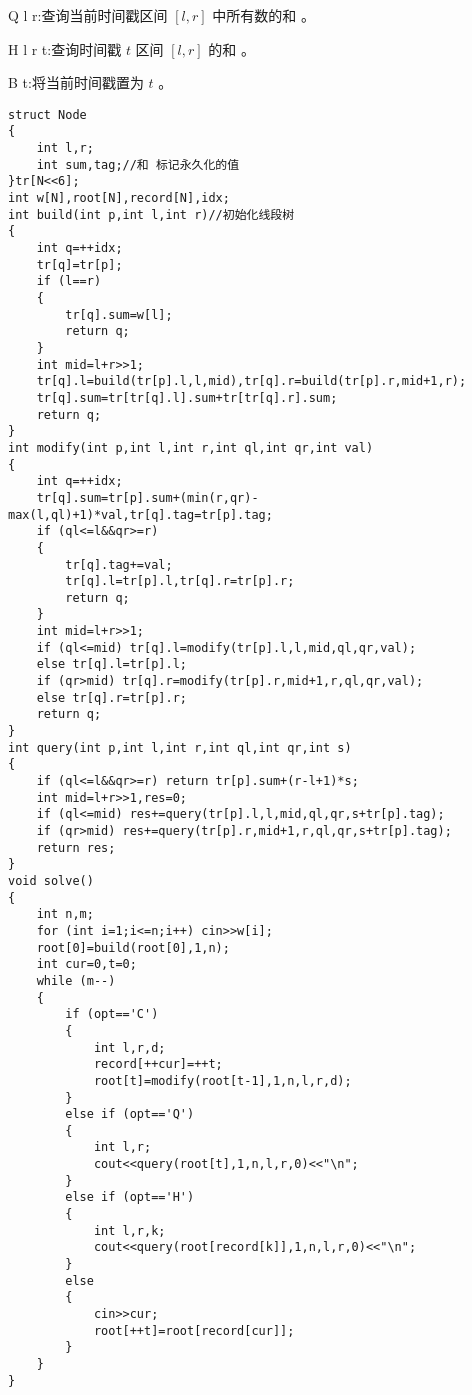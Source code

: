 \documentclass[a4paper]{ctexart}
\begin{document}
Q l r:查询当前时间戳区间 $[l,r]$ 中所有数的和 。

H l r t:查询时间戳 $t$ 区间 $[l,r]$ 的和 。

B t:将当前时间戳置为 $t$ 。

\begin{lstlisting}
struct Node
{
    int l,r;
    int sum,tag;//和 标记永久化的值
}tr[N<<6];
int w[N],root[N],record[N],idx;
int build(int p,int l,int r)//初始化线段树
{
    int q=++idx;
    tr[q]=tr[p];
    if (l==r)
    {
        tr[q].sum=w[l];
        return q;
    }
    int mid=l+r>>1;
    tr[q].l=build(tr[p].l,l,mid),tr[q].r=build(tr[p].r,mid+1,r);
    tr[q].sum=tr[tr[q].l].sum+tr[tr[q].r].sum;
    return q;
}
int modify(int p,int l,int r,int ql,int qr,int val)
{
    int q=++idx;
    tr[q].sum=tr[p].sum+(min(r,qr)-max(l,ql)+1)*val,tr[q].tag=tr[p].tag;
    if (ql<=l&&qr>=r)
    {
        tr[q].tag+=val;
        tr[q].l=tr[p].l,tr[q].r=tr[p].r;
        return q;
    }
    int mid=l+r>>1;
    if (ql<=mid) tr[q].l=modify(tr[p].l,l,mid,ql,qr,val);
    else tr[q].l=tr[p].l;
    if (qr>mid) tr[q].r=modify(tr[p].r,mid+1,r,ql,qr,val);
    else tr[q].r=tr[p].r;
    return q;
}
int query(int p,int l,int r,int ql,int qr,int s)
{
    if (ql<=l&&qr>=r) return tr[p].sum+(r-l+1)*s;
    int mid=l+r>>1,res=0;
    if (ql<=mid) res+=query(tr[p].l,l,mid,ql,qr,s+tr[p].tag);
    if (qr>mid) res+=query(tr[p].r,mid+1,r,ql,qr,s+tr[p].tag);
    return res;
}
void solve()
{
    int n,m;
    for (int i=1;i<=n;i++) cin>>w[i];
    root[0]=build(root[0],1,n);
    int cur=0,t=0;
    while (m--)
    {
        if (opt=='C')
        {
            int l,r,d;
            record[++cur]=++t;
            root[t]=modify(root[t-1],1,n,l,r,d);
        }
        else if (opt=='Q')
        {
            int l,r;
            cout<<query(root[t],1,n,l,r,0)<<"\n";
        }
        else if (opt=='H')
        {
            int l,r,k;
            cout<<query(root[record[k]],1,n,l,r,0)<<"\n";
        }
        else
        {
            cin>>cur;
            root[++t]=root[record[cur]];
        }
    }
}
\end{lstlisting}
\end{document}
